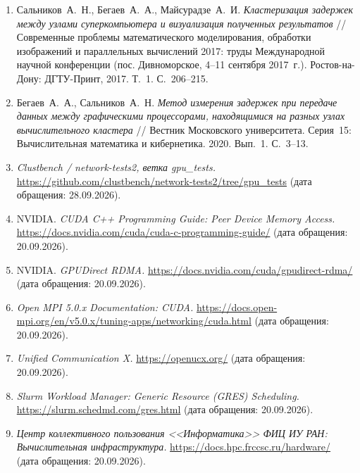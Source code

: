 \References
\begin{enumerate}
\item
    Сальников~А.~Н., Бегаев~А.~А., Майсурадзе~А.~И.
    \emph{Кластеризация задержек между узлами суперкомпьютера и визуализация полученных результатов} // Современные проблемы математического моделирования, обработки изображений и параллельных вычислений 2017: труды Международной научной конференции (пос. Дивноморское, 4--11 сентября 2017~г.). Ростов-на-Дону: ДГТУ-Принт, 2017. Т.~1. С.~206--215.

\item
    Бегаев~А.~А., Сальников~А.~Н.
    \emph{Метод измерения задержек при передаче данных между графическими процессорами, находящимися на разных узлах вычислительного кластера} // Вестник Московского университета. Серия~15: Вычислительная математика и кибернетика. 2020. Вып.~1. С.~3--13.

\item
    \emph{Clustbench / network-tests2, ветка gpu\_tests.}
    \url{https://github.com/clustbench/network-tests2/tree/gpu_tests} (дата обращения: 28.09.2026).

\item
    NVIDIA. \emph{CUDA C++ Programming Guide: Peer Device Memory Access.}
    \url{https://docs.nvidia.com/cuda/cuda-c-programming-guide/} (дата обращения: 20.09.2026).

\item
    NVIDIA. \emph{GPUDirect RDMA.}
    \url{https://docs.nvidia.com/cuda/gpudirect-rdma/} (дата обращения: 20.09.2026).

\item
    \emph{Open MPI 5.0.x Documentation: CUDA.}
    \url{https://docs.open-mpi.org/en/v5.0.x/tuning-apps/networking/cuda.html} (дата обращения: 20.09.2026).

\item
    \emph{Unified Communication X.}
    \url{https://openucx.org/} (дата обращения: 20.09.2026).

\item
    \emph{Slurm Workload Manager: Generic Resource (GRES) Scheduling.}
    \url{https://slurm.schedmd.com/gres.html} (дата обращения: 20.09.2026).

\item
    \emph{Центр коллективного пользования <<Информатика>> ФИЦ ИУ РАН: Вычислительная инфраструктура.}
    \url{https://docs.hpc.frccsc.ru/hardware/} (дата обращения: 20.09.2026).


\end{enumerate}
